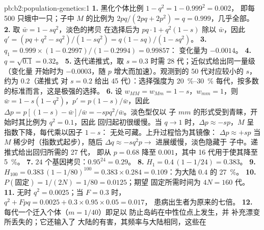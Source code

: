 \begin{solution}{pb:b2:population-genetics:1}
\textbf{1.} 黑化个体比例 $1 - q^{2} = 1 - 0.999^{2} = 0.002$，
即每 500 只蛾中一只；子中 $M$ 的比例为
$2pq/(2pq + 2p^{2}) = q = 0.999$，几乎全部。
\textbf{2.} 取 $\bar w = 1 - sq^{2}$，淡色的拷贝
在选择后为 $pq\cdot 1 + q^{2}(1 - s)$ 除以 $\bar w$，因此 $q'
= (pq + q^{2} - sq^{2})/(1 - sq^{2}) = q(1 - sq)/(1 - sq^{2})$。
\textbf{3.} $q_1 = 0.999\times(1 - 0.2997)/(1 - 0.2994) = 0.99857$：
变化量为 $-0.0014$。
\textbf{4.} $q = \sqrt{0.1} = 0.32$。
\textbf{5.} 迭代递推式，取 $s =
0.3$ 时需 28 代；近似式给出同一量级（变化量
开始时为 $-0.0003$，随 $p$ 增大而加速）。观测到的 50
代对应较小的 $s$，约为 $0.2$（递推式
对 $s = 0.2$ 给出 45 代）：选择强度为 \qtyrange{20}{30}{\%}
每代，按多数的标准而言，这是极强的选择。
\textbf{6.} 设 $w_{MM} = w_{Mm} = 1 - s$，$w_{mm} = 1$，则 $\bar w = 1
- s(1 - q^{2})$，$p' = p(1 - s)/\bar w$，因此 $\Delta p = p[(1 - s) -
\bar w]/\bar w = -spq^{2}/\bar w$。淡色型仅以
子 $mm$ 的形式受到青睐，开始时其比例为 $q^{2} = 0.1$，因此
回归起初很缓慢。当 $q \to 1$ 时，$\Delta p \approx -sp$，$M$
呈指数下降，每代乘以因子 $1 - s$：
无处可藏。上升过程恰为其镜像：
$\Delta p \approx +sp$ 当 $M$ 稀少时（指数式起步），随后
$\Delta q \approx -sq^{2}p \to$ 进展缓慢，淡色隐藏于
子中。递推式给出回归所需的 27 代，
即从 $p = 0.68$ 降至 $0.001$，其中 16 代用于使其降至 \qty{5}{\%}。
\textbf{7.} $24$ 个基因拷贝：$0.95^{24} = 0.29$。
\textbf{8.} $H_1 = 0.4\,(1 - 1/24) = 0.383$。
\textbf{9.} $H_{100} = 0.383\,(1 - 1/80)^{100} = 0.383\times 0.284 =
0.109$：为大陆 $0.4$ 的 \qty{27}{\%}。
\textbf{10.} $P(\text{固定}) = 1/(2N) = 1/80 = 0.0125$；期望
固定所需时间为 $4N = 160$ 代。
\textbf{11.} 无时 $q^{2} = 0.0025$；当 $F = 0.3$ 时，
$q^{2} + Fpq = 0.0025 + 0.3\times 0.95\times 0.05 = 0.017$，
患病出生者为原来的七倍。
\textbf{12.} 每代一个迁入个体（$m = 1/40$）即足以
防止岛屿在中性位点上发生，并
补充漂变所丢失的；它还输入了
大陆的有害，其频率与大陆相同，这些在

\end{solution}
